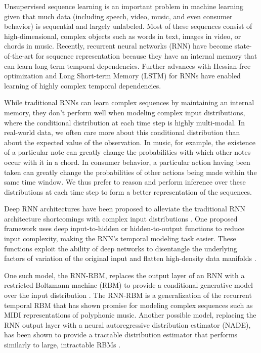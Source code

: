 Unsupervised sequence learning is an important problem in machine learning given that much data (including speech, video,  music, and even consumer behavior) is sequential and largely unlabeled. Most of these sequences consist of high-dimensional, complex objects such as words in text, images in video, or chords in music. Recently, recurrent neural networks (RNN) \cite{rnn} have become state-of-the-art for sequence representation because they have an internal memory that can learn long-term temporal dependencies. Further advances with Hessian-free optimization and Long Short-term Memory (LSTM) for RNNs \cite{hessian_free, lstm} have enabled learning of highly complex temporal dependencies.

While traditional RNNs can learn complex sequences by maintaining an internal memory, they don't perform well when modeling complex input distributions, where the conditional distribution at each time step is highly multi-modal. In real-world data, we often care more about this conditional distribution than about the expected value of the observation. In music, for example, the existence of a particular note can greatly change the probabilities with which other notes occur with it in a chord. In consumer behavior, a particular action having been taken can greatly change the probabilities of other actions being made within the same time window. We thus prefer to reason and perform inference over these distributions at each time step to form a better representation of the sequences.

Deep RNN architectures have been proposed to alleviate the traditional RNN architecture shortcomings with complex input distributions \cite{deep_rnn}. One proposed framework uses deep input-to-hidden or hidden-to-output functions to reduce input complexity, making the RNN's temporal modeling task easier. These functions exploit the ability of deep networks to disentangle the underlying factors of variation of the original input and flatten high-density data manifolds \cite{goodfellow09, glorot11, bengio13}.

One such model, the RNN-RBM, replaces the output layer of an RNN with a restricted Boltzmann machine (RBM) to provide a conditional generative model over the input distribution \cite{rnnrbm,boulanger14}. The RNN-RBM is a generalization of the recurrent temporal RBM \cite{rtrbm} that has shown promise for modeling complex sequences such as MIDI representations of polyphonic music. Another possible model, replacing the RNN output layer with a neural autoregressive distribution estimator (NADE),  has been shown to provide a tractable distribution estimator that performs similarly to large, intractable RBMs \cite{nade}.

